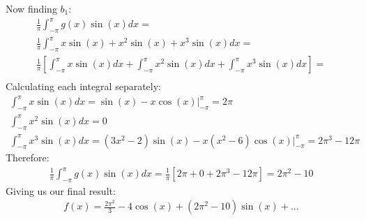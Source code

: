 \documentclass[12pt]{article}
\begin{document}
Now finding $b_1$:
\begin{equation}
    \begin{gathered}
        \frac{1}{\pi}\int_{-\pi}^{\pi}g(x)\sin(x)dx =\\
        \frac{1}{\pi}\int_{-\pi}^{\pi}x\sin(x) + x^2\sin(x) + x^3\sin(x)dx =\\
        \frac{1}{\pi}\left[\int_{-\pi}^{\pi}x\sin(x)dx + \int_{-\pi}^{\pi}x^2\sin(x)dx + \int_{-\pi}^{\pi}x^3\sin(x)dx\right] =\\
    \end{gathered}
\end{equation}
Calculating each integral separately:
\begin{equation}
    \begin{gathered}
        \int_{-\pi}^{\pi}x\sin(x)dx = \sin(x) - x\cos(x)\bigg|_{-\pi}^{\pi} = 2\pi\\
        \int_{-\pi}^{\pi}x^2\sin(x)dx = 0\\ 
        \int_{-\pi}^{\pi}x^3\sin(x)dx = (3x^2-2)\sin(x) - x(x^2-6)\cos(x)\bigg|_{-\pi}^{\pi} = 2\pi^3 - 12\pi
    \end{gathered}
\end{equation}
Therefore:
\begin{equation}
    \begin{gathered}
        \frac{1}{\pi}\int_{-\pi}^{\pi}g(x)\sin(x)dx = \frac{1}{\pi}\left[2\pi+0+2\pi^3-12\pi\right] = 2\pi^2-10
    \end{gathered}
\end{equation}
Giving us our final result:
\begin{equation}
    \begin{gathered}
        f(x) = \frac{2\pi^2}{3} - 4\cos(x) + (2\pi^2-10)\sin(x) + ...
    \end{gathered}
\end{equation}
\end{document}
